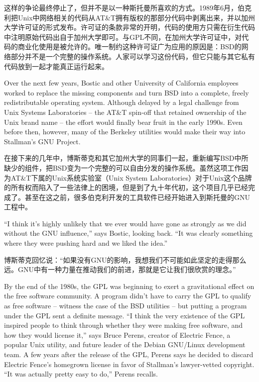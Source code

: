 \ifdefined\chs
这样的争论最终停止了，但并不是以一种斯托曼所喜欢的方式。1989年6月，伯克利把Unix中网络相关的代码从AT\&T拥有版权的那部分代码中剥离出来，并以加州大学许可证的形式发布。许可证的条款非常的开明，代码的使用方只需在衍生代码中注明原始代码出自于加州大学即可。与GPL不同，在加州大学许可证中，对代码的商业化使用是被允许的。唯一制约这种许可证广为应用的原因是：BSD的网络部分并不是一个完整的操作系统。人家可以学习这份代码，但它只能与其它私有代码放到一起才能真正运行起来。
\fi

\ifdefined\eng
Over the next few years, Bostic and other University of California employees worked to replace the missing components and turn BSD into a complete, freely redistributable operating system. Although delayed by a legal challenge from Unix Systems Laboratories -- the AT\&T spin-off that retained ownership of the Unix brand name -- the effort would finally bear fruit in the early 1990s. Even before then, however, many of the Berkeley utilities would make their way into Stallman's GNU Project.
\fi

\ifdefined\chs
在接下来的几年中，博斯蒂克和其它加州大学的同事们一起，重新编写BSD中所缺少的组件，把BSD变为一个完整的可以自由分发的操作系统。虽然这项工作因为AT\&T下属的Unix系统实验室（Unix System Laboratories）对于Unix这个品牌的所有权而陷入了一些法律上的困境，但是到了九十年代初，这个项目几乎已经完成了。甚至在这之前，很多伯克利开发的工具软件已经开始进入到斯托曼的GNU工程中。
\fi

\ifdefined\eng
``I think it's highly unlikely that we ever would have gone as strongly as we did without the GNU influence,'' says Bostic, looking back. ``It was clearly something where they were pushing hard and we liked the idea.''
\fi

\ifdefined\chs
博斯蒂克回忆说：``如果没有GNU的影响，我想我们不可能如此坚定的走得那么远。GNU中有一种力量在推动我们的前进，那就是它让我们很欣赏的理念。''
\fi

\ifdefined\eng
By the end of the 1980s, the GPL was beginning to exert a gravitational effect on the free software community. A program didn't have to carry the GPL to qualify as free software -- witness the case of the BSD utilities -- but putting a program under the GPL sent a definite message. ``I think the very existence of the GPL inspired people to think through whether they were making free software, and how they would license it,'' says Bruce Perens, creator of Electric Fence, a popular Unix utility, and future leader of the Debian GNU/Linux development team. A few years after the release of the GPL, Perens says he decided to discard Electric Fence's homegrown license in favor of Stallman's lawyer-vetted copyright. ``It was actually pretty easy to do,'' Perens recalls.
\fi

